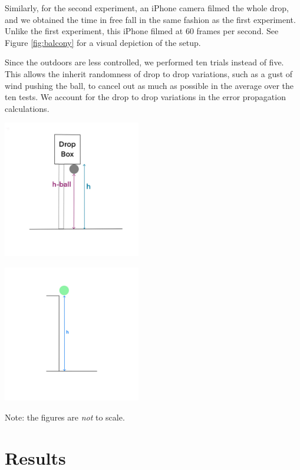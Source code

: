 \documentclass[12pt]{article}
\begin{document}
Similarly, for the second experiment, an iPhone camera filmed the whole drop, and we obtained the time in free fall in the same fashion as the first experiment. Unlike the first experiment, this iPhone filmed at 60 frames per second. See Figure \ref{fig:balcony} for a visual depiction of the setup.

Since the outdoors are less controlled, we performed ten trials instead of five. This allows the inherit randomness of drop to drop variations, such as a gust of wind pushing the ball, to cancel out as much as possible in the average over the ten tests. We account for the drop to drop variations in the error propagation calculations.

\begin{center}
\includegraphics[height=6cm]{./dropbox.jpg}
\end{center}

\begin{center}
\includegraphics[height=6cm]{./balcony.jpg}
\end{center}

Note: the figures are \emph{not} to scale.
\section{Results}
\label{sec:org31dff56}
\end{document}
